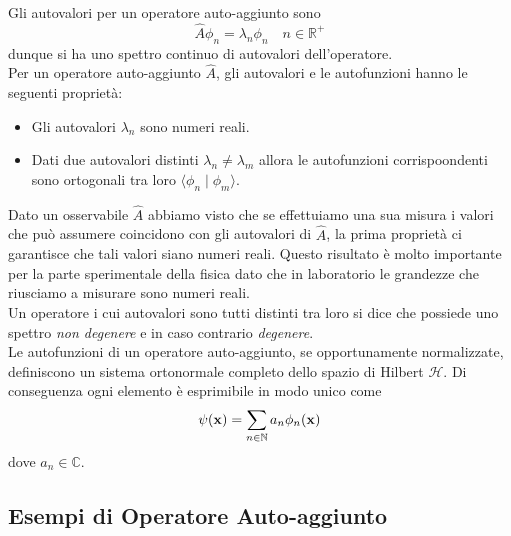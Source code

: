 Gli autovalori per un operatore auto-aggiunto sono
\begin{equation*}
	\hat{A}\phi_n = \lambda_n \phi_n \quad n \in \mathbb{R}^+
\end{equation*}
dunque si ha uno spettro continuo di autovalori dell'operatore.
\\

\noindent Per un operatore auto-aggiunto $\hat{A}$, gli autovalori e le autofunzioni hanno le seguenti propriet\`a:
\begin{itemize}
	\item Gli autovalori $\lambda_n$ sono numeri reali.
	\item Dati due autovalori distinti $\lambda_n \neq \lambda_m$ allora le autofunzioni corrispoondenti sono ortogonali tra loro $\langle \phi_n \;|\;\phi_m \rangle$.
\end{itemize}

\noindent Dato un osservabile $\hat{A}$ abbiamo visto che se effettuiamo una sua misura i valori che pu\`o assumere coincidono con gli autovalori di $\hat{A}$, la prima propriet\`a ci garantisce che tali valori siano numeri reali. Questo risultato \`e molto importante per la parte sperimentale della fisica dato che in laboratorio le grandezze che riusciamo a misurare sono numeri reali.
\\

\noindent Un operatore i cui autovalori sono tutti distinti tra loro si dice che possiede uno spettro \textit{non degenere} e in caso contrario \textit{degenere}.
\\

\noindent Le autofunzioni di un operatore auto-aggiunto, se opportunamente normalizzate, definiscono un sistema ortonormale completo dello spazio di Hilbert $\mathcal{H}$. Di conseguenza ogni elemento \`e esprimibile in modo unico come 
\begin{equation}
	\psi(\bold{x}) = \sum_{n \in \mathbb{N}}a_n \phi_n(\bold{x})
\end{equation}
dove $a_n \in \mathbb{C}$.

\subsection{Esempi di Operatore Auto-aggiunto}
